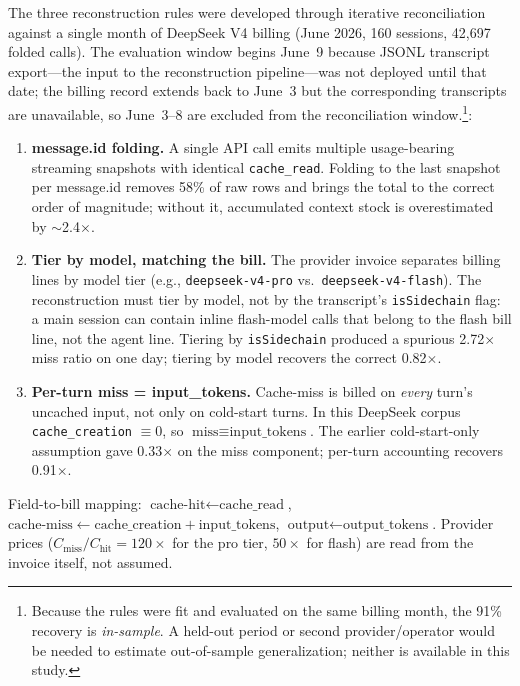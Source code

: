 \documentclass[11pt]{article}
\theoremstyle{definition}
\theoremstyle{remark}
\begin{document}
The three reconstruction rules were developed through iterative reconciliation against a single month of DeepSeek V4 billing (June 2026, 160 sessions, 42,697 folded calls). The evaluation window begins June~9 because JSONL transcript export---the input to the reconstruction pipeline---was not deployed until that date; the billing record extends back to June~3 but the corresponding transcripts are unavailable, so June~3--8 are excluded from the reconciliation window.\footnote{Because the rules were fit and evaluated on the same billing month, the 91\% recovery is \emph{in-sample}. A held-out period or second provider/operator would be needed to estimate out-of-sample generalization; neither is available in this study.}:

\begin{enumerate}[leftmargin=*,itemsep=0pt,topsep=0pt]
\item \textbf{message.id folding.} A single API call emits multiple usage-bearing streaming snapshots with identical \texttt{cache\_read}. Folding to the last snapshot per message.id removes 58\% of raw rows and brings the total to the correct order of magnitude; without it, accumulated context stock is overestimated by $\sim$2.4$\times$.
\item \textbf{Tier by model, matching the bill.} The provider invoice separates billing lines by model tier (e.g., \texttt{deepseek-v4-pro} vs.\ \texttt{deepseek-v4-flash}). The reconstruction must tier by model, not by the transcript's \texttt{isSidechain} flag: a main session can contain inline flash-model calls that belong to the flash bill line, not the agent line. Tiering by \texttt{isSidechain} produced a spurious 2.72$\times$ miss ratio on one day; tiering by model recovers the correct 0.82$\times$.
\item \textbf{Per-turn miss = input\_tokens.} Cache-miss is billed on \emph{every} turn's uncached input, not only on cold-start turns. In this DeepSeek corpus \texttt{cache\_creation} $\equiv 0$, so $\text{miss} \equiv \text{input\_tokens}$. The earlier cold-start-only assumption gave 0.33$\times$ on the miss component; per-turn accounting recovers 0.91$\times$.
\end{enumerate}

Field-to-bill mapping: $\text{cache-hit} \leftarrow \text{cache\_read}$, $\text{cache-miss} \leftarrow \text{cache\_creation} + \text{input\_tokens}$, $\text{output} \leftarrow \text{output\_tokens}$. Provider prices ($C_{\text{miss}}/C_{\text{hit}} = 120\times$ for the pro tier, $50\times$ for flash) are read from the invoice itself, not assumed.
\end{document}
